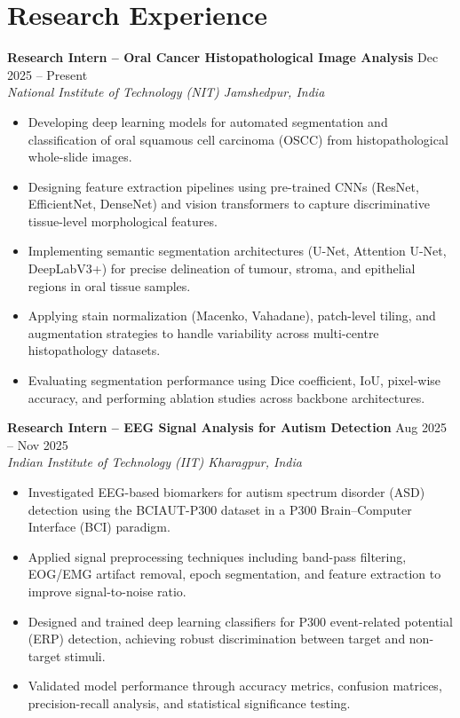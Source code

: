 \documentclass[a4paper,10pt]{article}
\begin{document}
\section{Research Experience}

\textbf{Research Intern -- Oral Cancer Histopathological Image Analysis} \hfill Dec 2025 -- Present\\
\textit{National Institute of Technology (NIT) Jamshedpur, India}
\begin{itemize}
\item Developing deep learning models for automated segmentation and classification of oral squamous cell carcinoma (OSCC) from histopathological whole-slide images.
\item Designing feature extraction pipelines using pre-trained CNNs (ResNet, EfficientNet, DenseNet) and vision transformers to capture discriminative tissue-level morphological features.
\item Implementing semantic segmentation architectures (U-Net, Attention U-Net, DeepLabV3+) for precise delineation of tumour, stroma, and epithelial regions in oral tissue samples.
\item Applying stain normalization (Macenko, Vahadane), patch-level tiling, and augmentation strategies to handle variability across multi-centre histopathology datasets.
\item Evaluating segmentation performance using Dice coefficient, IoU, pixel-wise accuracy, and performing ablation studies across backbone architectures.
\end{itemize}

\textbf{Research Intern -- EEG Signal Analysis for Autism Detection} \hfill Aug 2025 -- Nov 2025\\
\textit{Indian Institute of Technology (IIT) Kharagpur, India}
\begin{itemize}
\item Investigated EEG-based biomarkers for autism spectrum disorder (ASD) detection using the BCIAUT-P300 dataset in a P300 Brain--Computer Interface (BCI) paradigm.
\item Applied signal preprocessing techniques including band-pass filtering, EOG/EMG artifact removal, epoch segmentation, and feature extraction to improve signal-to-noise ratio.
\item Designed and trained deep learning classifiers for P300 event-related potential (ERP) detection, achieving robust discrimination between target and non-target stimuli.
\item Validated model performance through accuracy metrics, confusion matrices, precision-recall analysis, and statistical significance testing.
\end{itemize}
\end{document}
